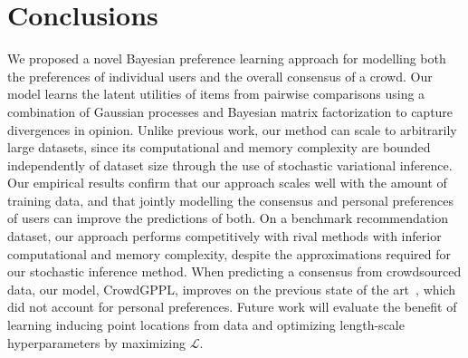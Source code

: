 \section{Conclusions}

We proposed a novel Bayesian preference learning approach 
for modelling both the preferences of individual users 
and the overall consensus of a crowd. 
Our model learns the latent utilities of items from pairwise comparisons 
using a combination of Gaussian processes and Bayesian matrix factorization 
to capture divergences in opinion.
Unlike previous work, our method can scale to arbitrarily large datasets,
since its computational and memory complexity  are bounded independently of dataset size
through the use of stochastic variational inference.
Our empirical results confirm that our approach scales well with the amount of training data,
and that jointly modelling the consensus and personal preferences of users can improve the predictions
of both.
On a benchmark recommendation dataset, our approach performs competitively
with rival methods with inferior computational and memory complexity,
despite the approximations required for our stochastic inference method.
When predicting a consensus from crowdsourced data, our model, CrowdGPPL, improves on 
the previous state of the art~\citep{simpson2018finding},
which did not account for personal preferences.
Future work will evaluate the benefit of learning inducing point locations from data and
optimizing length-scale hyperparameters by maximizing $\mathcal L$.
